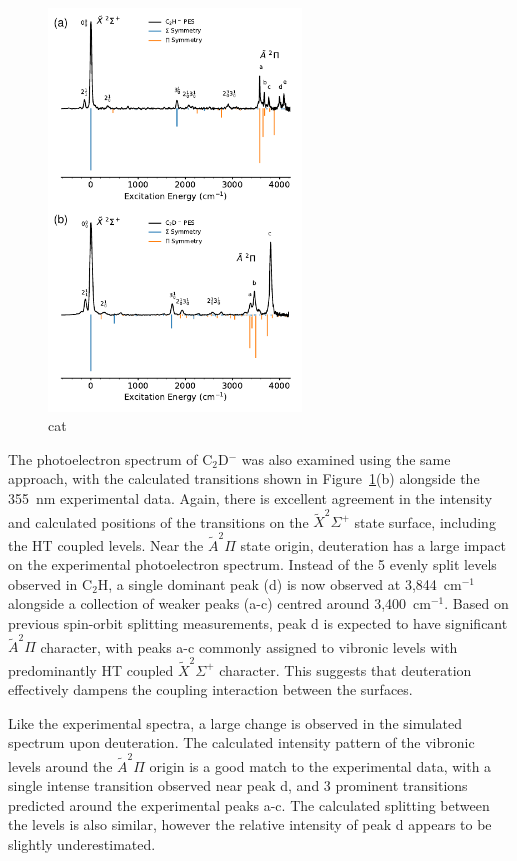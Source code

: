 \documentclass[journal=jpcafh,manuscript=article,layout=onecolumn, 12pt]{achemso}
\begin{document}
\begin{figure}[th!]
	\includegraphics[width=0.6\textwidth]{figures/Fig5.pdf}
	\caption{cat}
	\label{fig:C2H-plot}
\end{figure}

The photoelectron spectrum of C$_2$D$^-$ was also examined using the same approach, with the calculated transitions shown in Figure~\ref{fig:C2H-plot}(b) alongside the 355~nm experimental data. Again, there is excellent agreement in the intensity and calculated positions of the transitions on the $\tilde{X} ^2\Sigma^+$ state surface, including the HT coupled levels. Near the $\tilde{A} ^2\Pi$ state origin, deuteration has a large impact on the experimental photoelectron spectrum. Instead of the 5 evenly split levels observed in C$_2$H, a single dominant peak (d) is now observed at 3,844~cm$^{-1}$ alongside a collection of weaker peaks (a-c) centred around 3,400~cm$^{-1}$. Based on previous spin-orbit splitting measurements, peak d is expected to have significant $\tilde{A} ^2\Pi$ character, with peaks a-c commonly assigned to vibronic levels with predominantly HT coupled $\tilde{X} ^2\Sigma^+$ character. This suggests that deuteration effectively dampens the coupling interaction between the surfaces.

Like the experimental spectra, a large change is observed in the simulated spectrum upon deuteration. The calculated intensity pattern of the vibronic levels around the $\tilde{A} ^2\Pi$ origin is a good match to the experimental data, with a single intense transition observed near peak d, and 3 prominent transitions predicted around the experimental peaks a-c. The calculated splitting between the levels is also similar, however the relative intensity of peak d appears to be slightly underestimated. %
\end{document}
